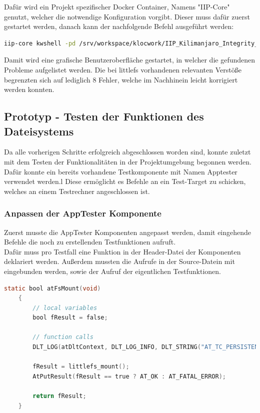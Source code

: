Dafür wird ein Projekt spezifischer Docker Container, Namens "IIP-Core" genutzt, welcher die notwendige Konfiguration vorgibt.
Dieser muss dafür zuerst gestartet werden, danach kann der nachfolgende Befehl ausgeführt werden:

\begin{lstlisting}[language=bash]
	iip-core kwshell -pd /srv/workspace/klocwork/IIP_Kilimanjaro_Integrity_core/.kwlp ./build.sh --build_variant=clu-m3-tgt
\end{lstlisting}

Damit wird eine grafische Benutzeroberfläche gestartet, in welcher die gefundenen Probleme aufgelistet werden.
Die bei littlefs vorhandenen relevanten Verstöße begrenzten sich auf lediglich 8 Fehler, welche im Nachhinein leicht korrigiert werden konnten.


\subsection{Prototyp - Testen der Funktionen des Dateisystems}
\label{section:prototyp_testeb}

Da alle vorherigen Schritte erfolgreich abgeschlossen worden sind,
konnte zuletzt mit dem Testen der Funktionalitäten in der Projektumgebung begonnen werden.\\

Dafür konnte ein bereits vorhandene Testkomponente mit Namen Apptester verwendet werden.l
Diese ermöglicht es Befehle an ein Test-Target zu schicken, welches an einem Testrechner angeschlossen ist.

\subsubsection{Anpassen der AppTester Komponente}
Zuerst musste die AppTester Komponenten angepasst werden,
damit eingehende Befehle die noch zu erstellenden Testfunktionen aufruft.\\

Dafür muss pro Testfall eine Funktion in der Header-Datei der Komponenten deklariert werden.
Außerdem mussten die Aufrufe in der Source-Datein mit eingebunden werden, sowie der Aufruf der eigentlichen Testfunktionen.

\begin{lstlisting}[language=C, basicstyle=\tiny]
	static bool atFsMount(void)
	{
		// local variables
		bool fResult = false;
		
		// function calls
		DLT_LOG(atDltContext, DLT_LOG_INFO, DLT_STRING("AT_TC_PERSISTENCY: Mount Filesystem"));
		
		fResult = littlefs_mount();
		AtPutResult(fResult == true ? AT_OK : AT_FATAL_ERROR);
		
		return fResult;
	}
\end{lstlisting}

